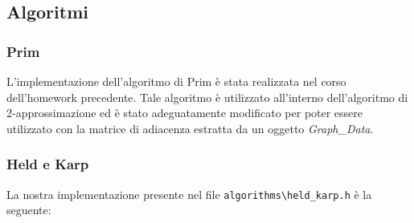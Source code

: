 \documentclass[]{article}
\begin{document}
\subsection{Algoritmi}
\subsubsection{Prim}
L'implementazione dell'algoritmo di Prim è stata realizzata nel corso dell'homework precedente. Tale algoritmo è utilizzato all'interno dell'algoritmo di 2-approssimazione ed è stato adeguatamente modificato per poter essere utilizzato con la matrice di adiacenza estratta da un oggetto \textit{Graph\_Data}.
\subsubsection{Held e Karp}
\begin{flushleft}
La nostra implementazione presente nel file \verb|algorithms\held_karp.h| è la seguente:
\lstset{language=c++, style=mystyle}



\end{flushleft}
\end{document}

